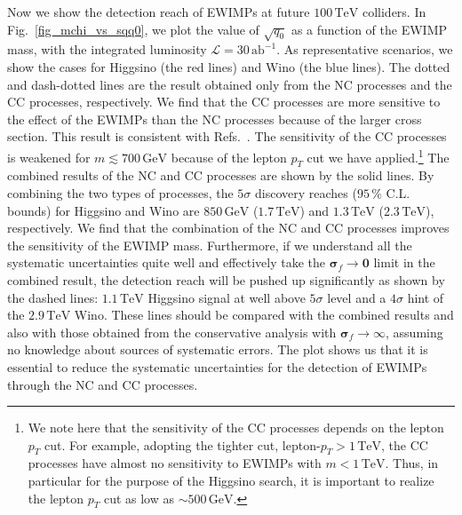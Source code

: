 \documentclass[12pt,twoside,book]{article}
\begin{document}
Now we show the detection reach of EWIMPs at future
$100\,\mathrm{TeV}$ colliders.  In Fig.~\ref{fig_mchi_vs_sqq0}, we
plot the value of $\sqrt{q_0}$ as a function of the EWIMP mass, with
the integrated luminosity $\mathcal{L}=30\,\mathrm{ab}^{-1}$.  As
representative scenarios, we show the cases for Higgsino (the red
lines) and Wino (the blue lines).  The dotted and dash-dotted lines
are the result obtained only from the NC processes and the CC processes,
respectively.  We find that the CC processes are more sensitive to the
effect of the EWIMPs than the NC processes because of the larger cross
section.  This result is consistent with Refs.~\cite{DiLuzio:2018jwd,Matsumoto:2018ioi}.
The sensitivity of the CC processes is weakened for $m \lesssim 700\,
\mathrm{GeV}$ %
because of the lepton $p_T$ cut we have applied.\footnote{
  We note here that the sensitivity of the CC processes depends on the
  lepton $p_T$ cut.  For example, adopting the tighter cut,
  lepton-$p_T > 1\,\mathrm{TeV}$, the CC processes have almost no
  sensitivity to EWIMPs with $m < 1\,\mathrm{TeV}$.  Thus, in
  particular for the purpose of the Higgsino search, it is important
  to realize the lepton $p_T$ cut as low as $\sim 500\, \mathrm{GeV}$.
} The combined results of the NC and CC processes are shown by the
solid lines.  By combining the two types of processes, the $5\sigma$
discovery reaches ($95\,\%$ C.L. bounds) for Higgsino and Wino are
$850\,\mathrm{GeV}$ ($1.7\,\mathrm{TeV}$) and $1.3\,\mathrm{TeV}$
($2.3\,\mathrm{TeV}$), respectively.  We find that the combination of
the NC and CC processes improves the sensitivity of the EWIMP mass.
Furthermore, if we understand all the systematic uncertainties quite
well and effectively take the $\bm{\sigma}_f \to \bm{0}$ limit in the
combined result, the detection reach will be pushed up significantly
as shown by the dashed lines: $1.1\,\mathrm{TeV}$ Higgsino signal at
well above $5\sigma$ level and a $4\sigma$ hint of the
$2.9\,\mathrm{TeV}$ Wino.  These lines should be compared with the
combined results and also with those obtained from the conservative
analysis with $\bm{\sigma}_f \to \infty$, assuming no knowledge about
sources of systematic errors.  The plot shows us that it is essential
to reduce the systematic uncertainties for the detection of EWIMPs
through the NC and CC processes.
\end{document}
